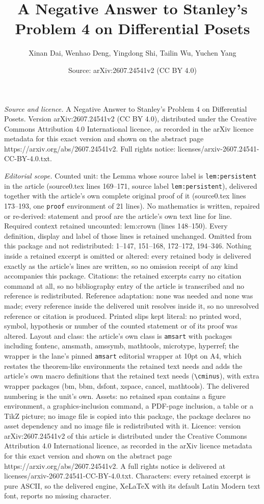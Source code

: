 \documentclass[10pt,a4paper]{amsart}
\title[A Negative Answer to Stanley's Problem 4 on Differential Pos]{A Negative Answer to Stanley's Problem 4 on Differential Posets}
\author{Xinan Dai, Wenhao Deng, Yingdong Shi, Tailin Wu, Yuchen Yang}
\date{Source: arXiv:2607.24541v2 (CC BY 4.0)}
\begin{document}
\maketitle

\noindent\emph{Source and licence.} A Negative Answer to Stanley's Problem 4 on Differential Posets. Version arXiv:2607.24541v2 (CC BY 4.0), distributed under the Creative Commons Attribution 4.0 International licence, as recorded in the arXiv licence metadata for this exact version and shown on the abstract page https://arxiv.org/abs/2607.24541v2. Full rights notice: licenses/arxiv-2607.24541-CC-BY-4.0.txt.\par\smallskip

\noindent\textit{Editorial scope.} Counted unit: the Lemma whose source label is \texttt{lem:persistent} in the article (source0.tex lines 169--171, source label \texttt{lem:persistent}), delivered together with the article's own complete original proof of it (source0.tex lines 173--193, one \texttt{proof} environment of 21 lines). No mathematics is written, repaired or re-derived: statement and proof are the article's own text line for line. Required context retained uncounted: lem:crown (lines 148--150). Every definition, display and label of those lines is retained unchanged. Omitted from this package and not redistributed: 1--147, 151--168, 172--172, 194--346. Nothing inside a retained excerpt is omitted or altered: every retained body is delivered exactly as the article's lines are written, so no omission receipt of any kind accompanies this package. Citations: the retained excerpts carry no citation command at all, so no bibliography entry of the article is transcribed and no reference is redistributed. Reference adaptation: none was needed and none was made; every reference inside the delivered unit resolves inside it, so no unresolved reference or citation is produced. Printed slips kept literal: no printed word, symbol, hypothesis or number of the counted statement or of its proof was altered. Layout and class: the article's own class is \texttt{amsart} with packages including fontenc, amsmath, amssymb, mathtools, microtype, hyperref; the wrapper is the lane's pinned \texttt{amsart} editorial wrapper at 10pt on A4, which restates the theorem-like environments the retained text needs and adds the article's own macro definitions that the retained text needs (\texttt{\textbackslash cminus}), with extra wrapper packages (bm, bbm, dsfont, xspace, cancel, mathtools). The delivered numbering is the unit's own. Assets: no retained span contains a figure environment, a graphics-inclusion command, a PDF-page inclusion, a table or a TikZ picture; no image file is copied into this package, the package declares no asset dependency and no image file is redistributed with it. Licence: version arXiv:2607.24541v2 of this article is distributed under the Creative Commons Attribution 4.0 International licence, as recorded in the arXiv licence metadata for this exact version and shown on the abstract page https://arxiv.org/abs/2607.24541v2. A full rights notice is delivered at licenses/arxiv-2607.24541-CC-BY-4.0.txt. Characters: every retained excerpt is pure ASCII, so the delivered engine, XeLaTeX with its default Latin Modern text font, reports no missing character.
\end{document}
